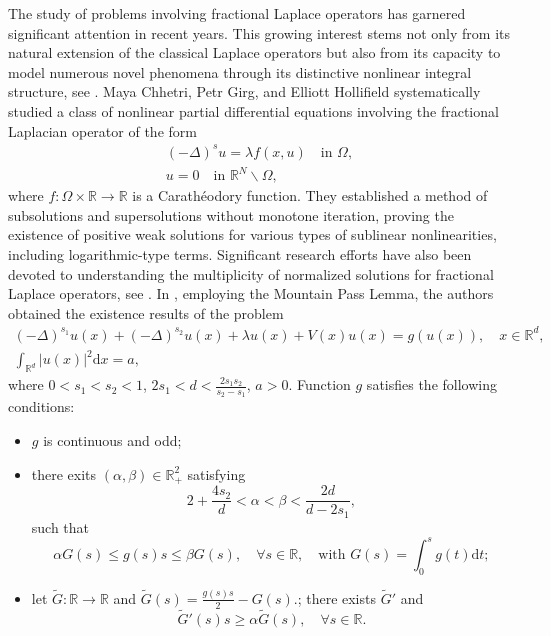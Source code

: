 \documentclass[reqno]{amsart}
\begin{document}
The study of problems involving fractional Laplace operators has garnered significant attention
in recent years. This growing interest stems not only from its natural extension of the classical
Laplace operators but also from its capacity to model numerous novel phenomena through its distinctive nonlinear integral structure, see \cite{ref7,ref11,ref14}.
Maya Chhetri, Petr Girg, and Elliott Hollifield \cite{ref10} systematically studied a class of
nonlinear partial differential equations involving the fractional Laplacian operator of the form
\begin{gather*}
(-\Delta)^{s}u=\lambda f(x,u)\quad  \text{in }\Omega,\\
u=0  \quad \text{in }\mathbb{R}^N\backslash\Omega,
\end{gather*}
where $f:\Omega\times\mathbb{R}\to\mathbb{R}$ is a Carath\'{e}odory function.
They established a method of subsolutions and supersolutions without monotone iteration,
proving the existence of positive weak solutions for various types of sublinear nonlinearities,
including logarithmic-type terms.
Significant research efforts have also been devoted to understanding the multiplicity of
normalized solutions for fractional Laplace operators, see \cite{ref19, ref20, ref25, ref34}.
In \cite{ref8}, employing the Mountain Pass Lemma,  the authors obtained the  existence
results of  the problem
\begin{gather*}
(-\Delta)^{s_1} u(x)+(-\Delta)^{s_2} u(x)+\lambda u(x)+V(x)u(x)=g(u(x)),\quad
x\in \mathbb{R}^{d},\\
\int_{\mathbb{R}^{d}}|u(x)|^{2}\mathrm{d}x=a,
\end{gather*}
where $0<s_1<s_2<1$, $2s_1<d<\frac{2s_1s_2}{s_2-s_1}$, $a>0$.
Function $g$  satisfies  the following conditions:
\begin{itemize}
\item[(A10)] $g$ is continuous and odd;

\item[(A11)] there exits $(\alpha, \beta)\in\mathbb{R}_{+}^{2}$ satisfying
$$
2+\frac{4s_2}{d}<\alpha<\beta<\frac{2d}{d-2s_1},
$$
such that
$$
\alpha G(s)\le g(s)s\le \beta G(s),\quad\forall s\in\mathbb{R}, \quad\text{with }
G(s)=\int_0^{s}g(t)\mathrm{d}t;
$$
\item[(A12)] let
$\tilde{G}:\mathbb{R}\to\mathbb{R}$ and
$\tilde{G}(s)=\frac{g(s)s}{2}-G(s)$.; there exists $\tilde{G}'$  and
$$
\tilde{G}'(s)s\ge\alpha\tilde{G}(s),\quad\forall s\in\mathbb{R}.
$$
\end{itemize}
\end{document}
